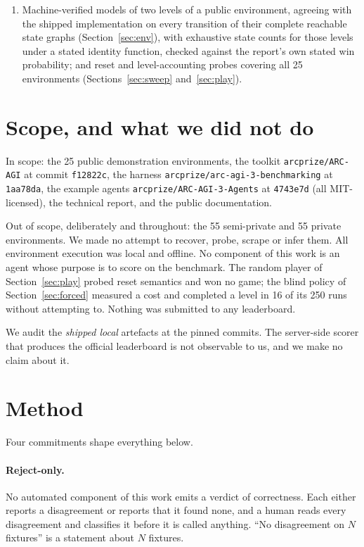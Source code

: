 \documentclass[11pt]{article}
\newcommand{\code}[1]{\texttt{#1}}
\begin{document}
\begin{enumerate}
      documentation problems are reported: the equation's cap, the budget's
      location, the unstated reset accounting, a stale code comment, and an
      omitted schema field.
\item Machine-verified models of two levels of a public environment, agreeing
      with the shipped implementation on every transition of their complete
      reachable state graphs (Section~\ref{sec:env}), with exhaustive state
      counts for those levels under a stated identity function, checked against
      the report's own stated win probability; and reset and level-accounting
      probes covering all 25 environments (Sections~\ref{sec:sweep}
      and~\ref{sec:play}).
\end{enumerate}

\section{Scope, and what we did not do}
\label{sec:scope}

In scope: the 25 public demonstration environments, the toolkit
\code{arcprize/ARC-AGI} at commit \code{f12822c}, the harness
\code{arcprize/arc-agi-3-benchmarking} at \code{1aa78da}, the example agents
\code{arcprize/ARC-AGI-3-Agents} at \code{4743e7d} (all MIT-licensed), the
technical report, and the public documentation.

Out of scope, deliberately and throughout: the 55 semi-private and 55 private
environments. We made no attempt to recover, probe, scrape or infer them. All
environment execution was local and offline. No component of this work is an
agent whose purpose is to score on the benchmark. The random player of
Section~\ref{sec:play} probed reset semantics and won no game; the blind policy
of Section~\ref{sec:forced} measured a cost and completed a level in 16 of its
250 runs without attempting to. Nothing was submitted to any leaderboard.

We audit the \emph{shipped local} artefacts at the pinned commits. The
server-side scorer that produces the official leaderboard is not observable to
us, and we make no claim about it.

\section{Method}
\label{sec:method}

Four commitments shape everything below.

\paragraph{Reject-only.} No automated component of this work emits a verdict of
correctness. Each either reports a disagreement or reports that it found none,
and a human reads every disagreement and classifies it before it is called
anything. ``No disagreement on $N$ fixtures'' is a statement about $N$ fixtures.
\end{document}

